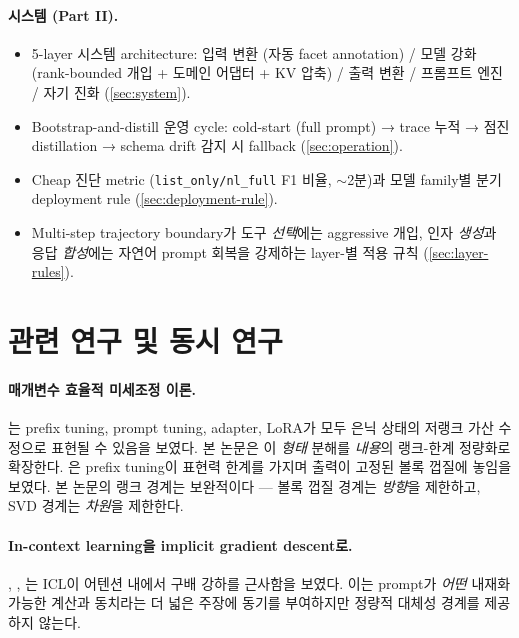 \documentclass[11pt]{article}
\theoremstyle{definition}
\begin{document}
\paragraph{시스템 (Part II).}
\begin{itemize}[leftmargin=*]
\item 5-layer 시스템 architecture: 입력 변환 (자동 facet annotation) / 모델 강화 (rank-bounded 개입 + 도메인 어댑터 + KV 압축) / 출력 변환 / 프롬프트 엔진 / 자기 진화 (\cref{sec:system}).
\item Bootstrap-and-distill 운영 cycle: cold-start (full prompt) → trace 누적 → 점진 distillation → schema drift 감지 시 fallback (\cref{sec:operation}).
\item Cheap 진단 metric (\texttt{list\_only/nl\_full} F1 비율, $\sim$2분)과 모델 family별 분기 deployment rule (\cref{sec:deployment-rule}).
\item Multi-step trajectory boundary가 도구 \emph{선택}에는 aggressive 개입, 인자 \emph{생성}과 응답 \emph{합성}에는 자연어 prompt 회복을 강제하는 layer-별 적용 규칙 (\cref{sec:layer-rules}).
\end{itemize}

\section{관련 연구 및 동시 연구}
\label{sec:related}

\paragraph{매개변수 효율적 미세조정 이론.}
\citet{he2022unified}는 prefix tuning, prompt tuning, adapter, LoRA가 모두 은닉 상태의 저랭크 가산 수정으로 표현될 수 있음을 보였다. 본 논문은 이 \emph{형태} 분해를 \emph{내용}의 랭크-한계 정량화로 확장한다. \citet{petrov2024prompting}은 prefix tuning이 표현력 한계를 가지며 출력이 고정된 볼록 껍질에 놓임을 보였다. 본 논문의 랭크 경계는 보완적이다 --- 볼록 껍질 경계는 \emph{방향}을 제한하고, SVD 경계는 \emph{차원}을 제한한다.

\paragraph{In-context learning을 implicit gradient descent로.}
\citet{akyurek2023icl}, \citet{vonoswald2023icl}, \citet{ahn2023preconditioned}는 ICL이 어텐션 내에서 구배 강하를 근사함을 보였다. 이는 prompt가 \emph{어떤} 내재화 가능한 계산과 동치라는 더 넓은 주장에 동기를 부여하지만 정량적 대체성 경계를 제공하지 않는다.
\end{document}
